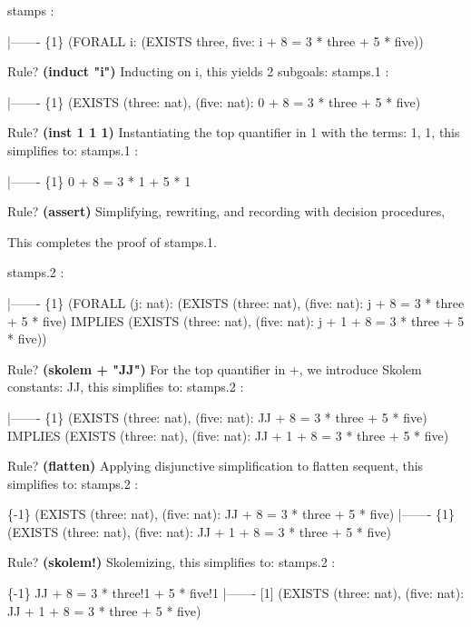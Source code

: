 \begin{pvsscript}
     stamps :  

       |-------
     \{1\}   (FORALL i: (EXISTS three, five: i + 8 = 3 * three + 5 * five))
     
     Rule? {\bf (induct "i")}
     Inducting on i,
     this yields  2 subgoals: 
     stamps.1 :  
     
       |-------
     \{1\}   (EXISTS (three: nat), (five: nat): 0 + 8 = 3 * three + 5 * five)
     
     Rule? {\bf (inst 1 1 1)}
     Instantiating the top quantifier in 1 with the terms: 
      1, 1,
     this simplifies to: 
     stamps.1 :  
     
       |-------
     \{1\}   0 + 8 = 3 * 1 + 5 * 1
     
     Rule? {\bf (assert)}
     Simplifying, rewriting, and recording with decision procedures,
     
     This completes the proof of stamps.1.
     
     stamps.2 :  
     
       |-------
     \{1\}   (FORALL (j: nat):
              (EXISTS (three: nat), (five: nat): j + 8 = 3 * three + 5 * five)
                IMPLIES
                (EXISTS (three: nat), (five: nat):
                   j + 1 + 8 = 3 * three + 5 * five))
     
     Rule? {\bf (skolem + "JJ")}
     For the top quantifier in +, we introduce Skolem constants: JJ,
     this simplifies to: 
     stamps.2 :  
     
       |-------
     \{1\}   (EXISTS (three: nat), (five: nat): JJ + 8 = 3 * three + 5 * five)
             IMPLIES
             (EXISTS (three: nat), (five: nat):
                JJ + 1 + 8 = 3 * three + 5 * five)
     
     Rule? {\bf (flatten)}
     Applying disjunctive simplification to flatten sequent,
     this simplifies to: 
     stamps.2 :  
     
     \{-1\}   (EXISTS (three: nat), (five: nat): JJ + 8 = 3 * three + 5 * five)
       |-------
     \{1\}   (EXISTS (three: nat), (five: nat): JJ + 1 + 8 = 3 * three + 5 * five)
     
     Rule? {\bf (skolem!)}
     Skolemizing,
     this simplifies to: 
     stamps.2 :  
     
     \{-1\}   JJ + 8 = 3 * three!1 + 5 * five!1
       |-------
     [1]   (EXISTS (three: nat), (five: nat): JJ + 1 + 8 = 3 * three + 5 * five)
     

\end{pvsscript}
